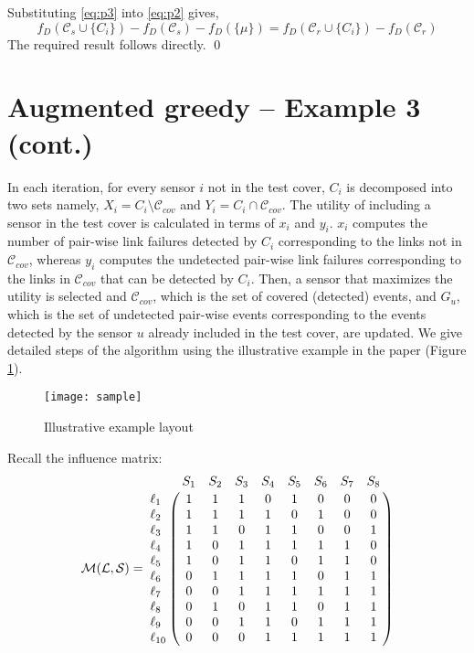 \documentclass[twocolumn]{autart}
\begin{document}
Substituting \eqref{eq:p3} into \eqref{eq:p2} gives,
\begin{equation*}
f_D(\mathcal{C}_s\cup\{C_i\}) -  f_D(\mathcal{C}_s) -f_D(\{\mu\}) = f_D(\mathcal{C}_r \cup\{C_i\}) - f_D(\mathcal{C}_r) 
\end{equation*}
The required result follows directly. \qed


\section{Augmented greedy -- Example 3 (cont.)}
In each iteration, for every sensor $i$ not in the test cover, $C_i$ is decomposed into two sets namely, $X_i=C_i\setminus\mathcal{C}_{cov}$ and $Y_i=C_i\cap\mathcal{C}_{cov}$. The utility of including a sensor in the test cover is calculated in terms of $x_i$ and $y_i$. $x_i$ computes the number of pair-wise link failures detected by $C_i$ corresponding to the links not in $\mathcal{C}_{cov}$, whereas $y_i$ computes the undetected pair-wise link failures corresponding to the links in $\mathcal{C}_{cov}$ that can be detected by $C_i$. Then, a sensor that maximizes the utility is selected and $\mathcal{C}_{cov}$, which is the set of covered (detected) events, and $G_u$, which is the set of undetected pair-wise events corresponding to the events detected by the sensor $u$ already included in the test cover, are updated. We give detailed steps of the algorithm using the illustrative example in the paper (Figure \ref{fig:3}). 

\begin{figure}[ht]
\centering
\texttt{[image: sample]}
\caption{Illustrative example layout}
\label{fig:3}
\end{figure}
Recall the influence matrix: \vspace{-0.5cm}
\footnotesize
$$\mathcal{M}( \mathcal{L},\mathcal{S}) = 
\bordermatrix{
& S_1& S_2& S_3& S_4& S_5& S_6& S_7& S_8\cr
\ell_1&1 & 1 & 1 & 0 & 1 & 0 & 0 & 0 \cr 
\ell_2&1 & 1 & 1 & 1 & 0 & 1 & 0 & 0 \cr
\ell_3&1 & 1 & 0 & 1 & 1 & 0 & 0 & 1 \cr 
\ell_4&1 & 0 & 1 & 1 & 1 & 1 & 1 & 0 \cr
\ell_5&1 & 0 & 1 & 1 & 0 & 1 & 1 & 0 \cr
\ell_6&0 & 1 & 1 & 1 & 1 & 0 & 1 & 1 \cr 
\ell_7&0 & 0 & 1 & 1 & 1 & 1 & 1 & 1 \cr
\ell_8&0 & 1 & 0 & 1 & 1 & 0 & 1 & 1 \cr
\ell_9&0 & 0 & 1 & 1 & 0 & 1 & 1 & 1 \cr
\ell_{10}& 0 & 0 & 0 & 1 & 1 & 1 & 1 & 1}
$$
\end{document}
